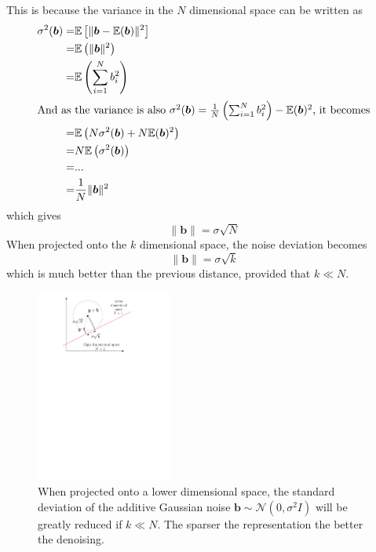 This is because the variance in the $N$ dimensional space can be written as
\begin{align*}
\sigma^2(\bm{b}) =& \mathbb{E}\left[\lVert \bm{b}-\mathbb{E}(\bm{b}) \rVert^2 \right]\\
=& \mathbb{E}\left(\lVert \bm{b} \rVert^2 \right)\\
=& \mathbb{E}\left(\sum^N_{i=1} b_i^2 \right)\\
\shortintertext{And as the variance is also $\sigma^2(\bm{b})= \frac{1}{N}\left(\sum_{i=1}^N b_i^2 \right) - \mathbb{E}(\bm{b})^2$, it becomes}
=& \mathbb{E} \left(N\sigma^2(\bm{b}) + N\mathbb{E}(\bm{b})^2\right)\\
=& N \mathbb{E} \left(\sigma^2(\bm{b})\right)\\
=& ... \\
=& \frac{1}{N}\lVert \bm{b} \rVert^2
\end{align*}
which gives 
$$ \lVert \bm{b} \rVert = \sigma\sqrt{N} $$
When projected onto the $k$ dimensional space, the noise deviation becomes
$$\lVert \bm{b} \rVert = \sigma\sqrt{k} $$
which is much better than the previous distance, provided that $k \ll N$. 

\begin{figure}[!ht]\centering
\includegraphics[width=0.4\textwidth]{figures/sparse-reduce-noise.pdf}
\caption{When projected onto a lower dimensional space, the standard deviation of the additive Gaussian noise $\bm{b} \sim \mathcal{N}(0,\sigma^2I)$ will be greatly reduced if $k \ll N$. The sparser the representation the better the denoising. \label{sparse_reduce_noise}}
\end{figure}

\clearpage


